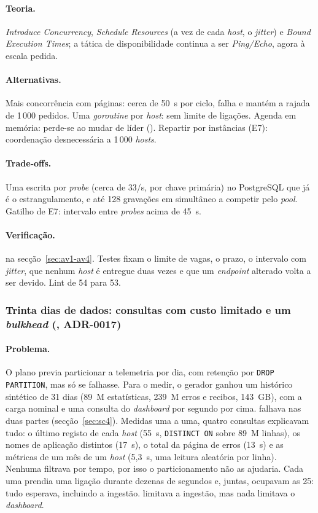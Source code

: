 \paragraph{Teoria.}
\emph{Introduce Concurrency}, \emph{Schedule Resources} (a vez de cada \emph{host}, o \emph{jitter}) e
\emph{Bound Execution Times}; a tática de disponibilidade continua a ser \emph{Ping/Echo}, agora à escala pedida.

\paragraph{Alternativas.}
Mais concorrência com páginas: cerca de 50~s por ciclo, falha  e mantém a rajada de 1\,000 pedidos.
Uma \emph{goroutine} por \emph{host}: sem limite de ligações. Agenda em memória: perde-se ao mudar de líder
(). Repartir por instâncias (E7): coordenação desnecessária a 1\,000 \emph{hosts}.

\paragraph{Trade-offs.}
Uma escrita por \emph{probe} (cerca de 33/s, por chave primária) no PostgreSQL que já é o estrangulamento, e até
128 gravações em simultâneo a competir pelo \emph{pool}. Gatilho de E7: intervalo entre \emph{probes} acima de 45~s.

\paragraph{Verificação.}
 na secção~\ref{sec:av1-av4}. Testes fixam o limite de vagas, o prazo, o intervalo com \emph{jitter}, que
nenhum \emph{host} é entregue duas vezes e que um \emph{endpoint} alterado volta a ser devido. Lint de 54 para 53.

\subsubsection{Trinta dias de dados: consultas com custo limitado e um \emph{bulkhead} (, ADR-0017)}
\label{sec:d9}

\paragraph{Problema.}
O plano previa particionar a telemetria por dia, com retenção por \texttt{DROP PARTITION}, mas só se 
falhasse. Para o medir, o gerador ganhou um histórico sintético de 31 dias (89~M estatísticas, 239~M erros e
recibos, 143~GB), com a carga nominal e uma consulta do \emph{dashboard} por segundo por cima.  falhava
nas duas partes (secção~\ref{sec:sc4}). Medidas uma a uma, quatro consultas explicavam tudo: o último registo de
cada \emph{host} (55~s, \texttt{DISTINCT ON} sobre 89~M linhas), os nomes de aplicação distintos (17~s), o total
da página de erros (13~s) e as métricas de um mês de um \emph{host} (5,3~s, uma leitura aleatória por linha).
Nenhuma filtrava por tempo, por isso o particionamento não as ajudaria. Cada uma prendia uma ligação durante
dezenas de segundos e, juntas, ocupavam as 25: tudo esperava, incluindo a ingestão.  limitava a ingestão,
mas nada limitava o \emph{dashboard}.

